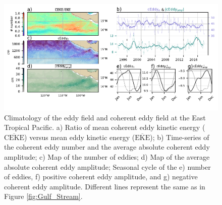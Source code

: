 \documentclass[draft,linenumbers]{agujournal2019}
\newcommand{\MEKE}{\overline{\textrm{EKE}}}
\newcommand{\MCEKE}{\overline{\textrm{CEKE}}}
\begin{document}

	\begin{figure}
	    \centering
	    \includegraphics[width=1\textwidth]{figures/regional_ratios_and_stats_V3_3.pdf}
	    \caption{Climatology of the eddy field and coherent eddy field at the East Tropical Pacific. a) Ratio of mean coherent eddy kinetic energy ($\MCEKE$) versus mean eddy kinetic energy ($\MEKE$); b) Time-series of the coherent eddy number and the average absolute coherent eddy amplitude; c) Map of the number of eddies; d) Map of the average absolute coherent eddy amplitude; Seasonal cycle of the e) number of eddies, f) positive coherent eddy amplitude, and g) negative coherent eddy amplitude. Different lines represent the same as in Figure \ref{fig:Gulf_Stream}.}
	    \label{fig:tehuantepec}
	\end{figure}
\end{document}

